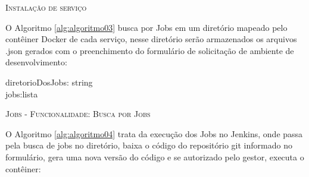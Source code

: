 \begin{algorithm}[H]
	\SetAlgoLined
	
	

	\caption{\textsc{Instalação de serviço}}
		\label{alg:algoritmo02}
\end{algorithm}

    \vspace*{2cm}
O Algoritmo \ref{alg:algoritmo03} busca por Jobs em um diretório mapeado pelo contêiner Docker de cada serviço, nesse diretório serão armazenados os arquivos .json gerados com o preenchimento do formulário de solicitação de ambiente de desenvolvimento:	

\begin{algorithm}[H]
	\SetAlgoLined
	
		diretorioDosJobs: string\\
		jobs:lista
	

	\caption{\textsc{Jobs - Funcionalidade: Busca por Jobs}}
		\label{alg:algoritmo03}
\end{algorithm}

    
O Algoritmo \ref{alg:algoritmo04} trata da execução dos Jobs no Jenkins, onde passa pela busca de jobs no diretório, baixa o código do repositório git informado no formulário, gera uma nova versão do código e se autorizado pelo gestor, executa o contêiner:	

